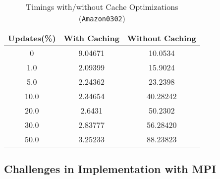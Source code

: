 \begin{table}[H]
    \centering
    \caption{Timings with/without Cache Optimizations (\texttt{Amazon0302})}
    \begin{tabular}{|c|c|c|}
        \hline
        \textbf{Updates(\%)} & \textbf{With Caching} & \textbf{Without Caching} \\
        \hline
        0 & 9.04671 & 10.0534 \\
        1.0 & 2.09399 & 15.9024 \\
        5.0 & 2.24362 & 23.2398\\
        10.0 & 2.34654 & 40.28242 \\
        20.0 & 2.6431 & 50.2302 \\
        30.0 & 2.83777 & 56.28420 \\
        50.0 & 3.25233 & 88.23823\\
        \hline
    \end{tabular}
    \label{tab:cache_optimizations}
\end{table}

\subsection{Challenges in Implementation with MPI}\label{Subsec: Challenges in Implementation with MPI}

